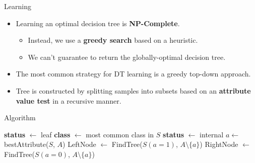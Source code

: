 \documentclass[serif, aspectratio=169]{beamer}
\begin{document}
\begin{frame}{Learning}
    \begin{itemize}
        \itemsep1em
        \justifying
        \item Learning an optimal decision tree is \textbf{NP-Complete}.
        \begin{itemize}
            \itemsep0.25em
            \item Instead, we use a \textbf{greedy search} based on a heuristic.
            \item We can't guarantee to return the globally-optimal decision tree.
        \end{itemize}
        \item The most common strategy for DT learning is a greedy top-down approach.
        \item Tree is constructed by splitting samples into subsets based on an \textbf{attribute value test} in a recursive manner.
    \end{itemize}
\end{frame}

\begin{frame}{Algorithm}
    \begin{algorithm}[H]
    \caption{Constructing DT}\label{alg:DT}
    \begin{algorithmic}[1]
     
            \State \textbf{status} $\gets$ leaf
            \State \textbf{class} $\gets$ most common class in $S$
        \Else
            \State \textbf{status} $\gets$ internal
            \State $a \gets$ \textcolor{deepred}{bestAttribute($S$, $A$)} 
            \State LeftNode $\gets$ FindTree($S(a=1)$, $A \setminus \{a\}$)
            \State RightNode $\gets$ FindTree($S(a=0)$, $A \setminus \{a\}$)
        \EndIf
    \EndProcedure
    \end{algorithmic}
    \end{algorithm}
\end{frame}
\end{document}
